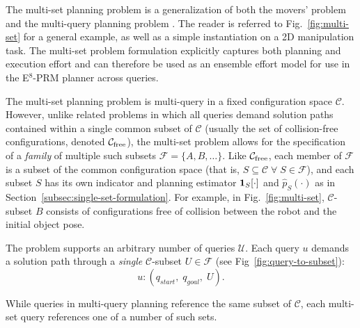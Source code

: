 The multi-set planning problem is
a generalization of both the movers' problem
and the multi-query planning problem%
\cite{kavrakietal1996prm}.
The reader is referred to
Fig.~\ref{fig:multi-set}
for a general example,
as well as a simple instantiation on a 2D manipulation task.
The multi-set problem formulation
explicitly captures both planning and execution effort
and can therefore be used as an ensemble effort model
for use in the E$^8$-PRM planner across queries.

The multi-set planning problem is multi-query in
a fixed configuration space $\mathcal{C}$.
However, unlike related problems in which all
queries demand solution paths contained within a single common subset of
$\mathcal{C}$
(usually the set of collision-free configurations, denoted
$\mathcal{C}_{\mbox{\scriptsize free}}$),
the multi-set problem allows for the specification of
a \emph{family} of multiple such subsets
$\mathcal{F} = \{ A, B, \dots \}$.
Like $\mathcal{C}_{\mbox{\scriptsize free}}$,
each member of $\mathcal{F}$
is a subset of the common configuration space
(that is,
$S \subseteq \mathcal{C} \;\forall\; S \in \mathcal{F}$),
and each subset $S$ has its own indicator and planning estimator
${\bf 1}_S[\cdot]$ and $\hat{p}_S(\cdot)$
as in Section~\ref{subsec:single-set-formulation}.
For example,
in Fig.~\ref{fig:multi-set},
$\mathcal{C}$-subset $B$
consists of configurations
free of collision between the robot and
the initial object pose.

The problem supports an arbitrary number of queries $\mathcal{U}$.
Each query $u$ demands a solution path through a \emph{single}
$\mathcal{C}$-subset $U \in \mathcal{F}$
(see Fig~\ref{fig:query-to-subset}):
\begin{equation}
  u : ( q_{start},\; q_{goal},\; U ) .
  \label{eqn:q}
\end{equation}

\begin{marginfigure}
   \centering
   \vspace{-0.05in}
   \vspace{0.1in}
   \caption{While queries in multi-query planning reference
     the same subset of $\mathcal{C}$,
     each multi-set query references one of a number of such sets.}
   \label{fig:query-to-subset}
\end{marginfigure}


